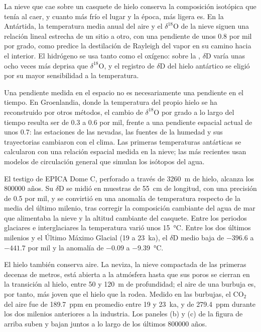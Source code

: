 La nieve que cae sobre un casquete de hielo conserva la composición isotópica que tenía al caer, y
cuanto más frío el lugar y la época, más ligera es. En la Antártida, la temperatura media anual del aire y
el $\delta^{18}$O de la nieve siguen una relación lineal estrecha de un sitio a otro, con una
pendiente de unos \num{0.8} por mil por grado, como predice la destilación de Rayleigh del vapor en su camino
hacia el interior. El hidrógeno se usa tanto como el oxígeno: sobre la , $\delta$D varía unas ocho veces más deprisa que $\delta^{18}$O, y
el registro de $\delta$D del hielo antártico se eligió por su mayor sensibilidad a la temperatura.

Una pendiente medida en el espacio no es necesariamente una pendiente en el tiempo. En Groenlandia, donde la
temperatura del propio hielo se ha reconstruido por otros métodos, el cambio de $\delta^{18}$O por grado
a lo largo del tiempo resulta ser de 0.3 a \num{0.6} por mil, frente a una pendiente espacial actual de unos
\num{0.7}: las estaciones de las nevadas, las fuentes de la humedad y sus trayectorias cambiaron con el
clima. Las primeras temperaturas antárticas se calcularon con una relación espacial medida en
la nieve; las más recientes usan modelos de circulación general que simulan los isótopos del agua.

El testigo de EPICA Dome C, perforado a través de \qty{3260}{m} de hielo, alcanza los \num{800000} años. Su
$\delta$D se midió en muestras de \qty{55}{cm} de longitud, con una precisión de \num{0.5} por mil, y
se convirtió en una anomalía de temperatura respecto de la media del último milenio, tras
corregir la composición cambiante del agua de mar que alimentaba la nieve y la altitud cambiante
del casquete. Entre los periodos glaciares e interglaciares la temperatura varió unos
\qty{15}{\celsius}. Entre los dos últimos milenios y el Último Máximo Glacial (\num{19} a
\qty{23}{ka}), el $\delta$D medio baja de $-396.6$ a $-441.7$ por mil y la anomalía de
$-0.09$ a \qty{-9.39}{\celsius}.

El hielo también conserva aire. La neviza, la nieve compactada de las primeras decenas de metros, está abierta a la
atmósfera hasta que sus poros se cierran en la transición al hielo, entre 50 y \qty{120}{m} de profundidad; el aire
de una burbuja es, por tanto, más joven que el hielo que la rodea. Medido en las burbujas, el CO$_2$ del
aire fue de \qty{189.7}{ppm} en promedio entre \num{19} y \qty{23}{ka}, y de \qty{279.4}{ppm} durante
los dos milenios anteriores a la industria. Los paneles (b) y (c) de la figura de arriba suben y bajan
juntos a lo largo de los últimos \num{800000} años.

